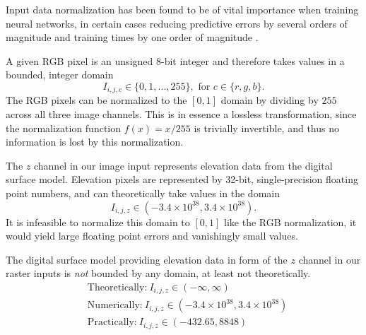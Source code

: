 Input data normalization has been found to be of vital importance when training neural networks, in certain cases reducing predictive errors by several orders of magnitude and training times by one order of magnitude \cite{input_normalization_1997}.


A given RGB pixel is an unsigned 8-bit integer and therefore takes values in a bounded, integer domain
%
\begin{equation*}
  I_{i,j,c} \in \{0, 1, ..., 255\}, \text{ for } c \in \{r, g, b\}.
\end{equation*}
%
The RGB pixels can be normalized to the $[0, 1]$ domain by dividing by $255$ across all three image channels.
This is in essence a lossless transformation, since the normalization function $f(x) = x/255$ is trivially invertible, and thus no information is lost by this normalization.

The $z$ channel in our image input represents elevation data from the digital surface model.
Elevation pixels are represented by 32-bit, single-precision floating point numbers, and can theoretically take values in the domain
%
\begin{equation*}
  I_{i,j,z} \in (-3.4 \times 10^{38}, 3.4 \times 10^{38}).
\end{equation*}
%
It is infeasible to normalize this domain to $[0, 1]$ like the RGB normalization, it would yield large floating point errors and vanishingly small values.

The digital surface model providing elevation data in form of the $z$ channel in our raster inputs is \textit{not} bounded by any domain, at least not theoretically.
~
\begin{align*}
  &\text{Theoretically:} ~ I_{i,j,z} \in (-\infty, \infty)
  \\
  &\text{Numerically:} ~ I_{i,j,z} \in (-3.4 \times 10^{38}, 3.4 \times 10^{38})
  \\
  &\text{Practically:} ~ I_{i,j,z} \in (-432.65, 8848)
\end{align*}
